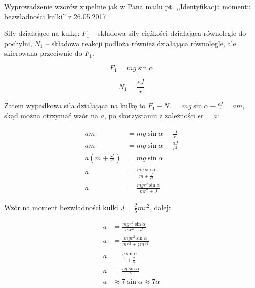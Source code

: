 \documentclass[10pt,a4paper,onecolumn]{article}
\begin{document}
Wyprowadzenie wzorów zupełnie jak w Pana mailu pt. ,,Identyfikacja momentu bezwładności kulki'' z 26.05.2017.

Siły działające na kulkę: $F_1$ -- składowa siły ciężkości działająca równolegle do pochylni, $N_1$ -- składowa reakcji podłoża również działająca równolegle, ale skierowana przeciwnie do $F_1$.

\[
F_1 = m g \sin \alpha
\]

\[
N_1 = \frac{\epsilon J}{r}
\]

Zatem wypadkowa siła działająca na kulkę to $F_1 - N_1 = m g \sin \alpha - \frac{\epsilon J}{r} = a m$, skąd można otrzymać wzór na $a$, po skorzystaniu z zależności $\epsilon r = a$:

\begin{align*}
    a m &= m g \sin \alpha - \frac{\epsilon J}{r} \\
    a m &= m g \sin \alpha - \frac{a J}{r^2} \\
    a (m + \frac{J}{r^2}) &= mg\sin\alpha \\
    a &= \frac{mg\sin\alpha}{m + \frac{J}{r^2}} \\
    a &= \frac{mgr^2\sin\alpha}{mr^2 + J}
\end{align*}

Wzór na moment bezwładności kulki $J = \frac{2}{5} m r^2$, dalej:

\begin{align*}
    a &= \frac{mgr^2\sin\alpha}{mr^2 + J} \\
    a &= \frac{mgr^2\sin\alpha}{mr^2 + \frac{2}{5}mr^2} \\
    a &= \frac{g\sin\alpha}{1+\frac{2}{5}} \\
    a &= \frac{5g\sin\alpha}{7} \\
    a &\approx 7\sin\alpha \approx 7 \alpha
\end{align*}
\end{document}

